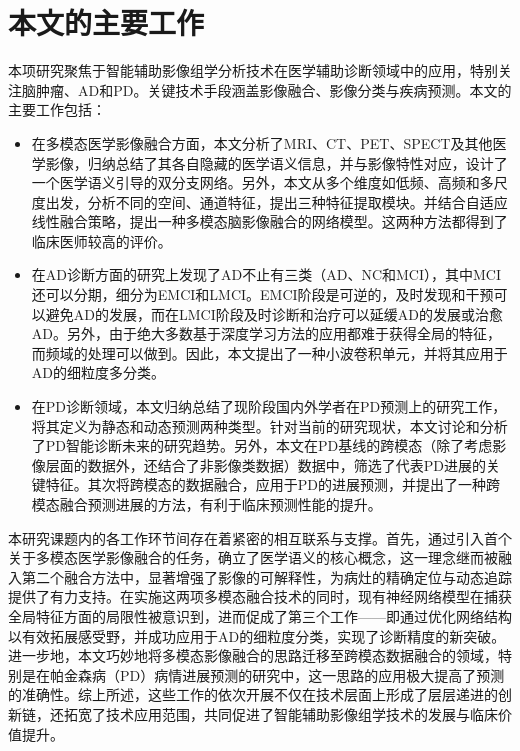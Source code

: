 \section{本文的主要工作}
本项研究聚焦于智能辅助影像组学分析技术在医学辅助诊断领域中的应用，特别关注脑肿瘤、AD和PD。关键技术手段涵盖影像融合、影像分类与疾病预测。本文的主要工作包括：
\begin{itemize}
    \item 在多模态医学影像融合方面，本文分析了MRI、CT、PET、SPECT及其他医学影像，归纳总结了其各自隐藏的医学语义信息，并与影像特性对应，设计了一个医学语义引导的双分支网络。另外，本文从多个维度如低频、高频和多尺度出发，分析不同的空间、通道特征，提出三种特征提取模块。并结合自适应线性融合策略，提出一种多模态脑影像融合的网络模型。这两种方法都得到了临床医师较高的评价。
    \item 在AD诊断方面的研究上发现了AD不止有三类（AD、NC和MCI），其中MCI还可以分期，细分为EMCI和LMCI。EMCI阶段是可逆的，及时发现和干预可以避免AD的发展，而在LMCI阶段及时诊断和治疗可以延缓AD的发展或治愈AD。另外，由于绝大多数基于深度学习方法的应用都难于获得全局的特征，而频域的处理可以做到。因此，本文提出了一种小波卷积单元，并将其应用于AD的细粒度多分类。
    \item 在PD诊断领域，本文归纳总结了现阶段国内外学者在PD预测上的研究工作，将其定义为静态和动态预测两种类型。针对当前的研究现状，本文讨论和分析了PD智能诊断未来的研究趋势。另外，本文在PD基线的跨模态（除了考虑影像层面的数据外，还结合了非影像类数据）数据中，筛选了代表PD进展的关键特征。其次将跨模态的数据融合，应用于PD的进展预测，并提出了一种跨模态融合预测进展的方法，有利于临床预测性能的提升。
\end{itemize}


本研究课题内的各工作环节间存在着紧密的相互联系与支撑。首先，通过引入首个关于多模态医学影像融合的任务，确立了医学语义的核心概念，这一理念继而被融入第二个融合方法中，显著增强了影像的可解释性，为病灶的精确定位与动态追踪提供了有力支持。在实施这两项多模态融合技术的同时，现有神经网络模型在捕获全局特征方面的局限性被意识到，进而促成了第三个工作——即通过优化网络结构以有效拓展感受野，并成功应用于AD的细粒度分类，实现了诊断精度的新突破。
进一步地，本文巧妙地将多模态影像融合的思路迁移至跨模态数据融合的领域，特别是在帕金森病（PD）病情进展预测的研究中，这一思路的应用极大提高了预测的准确性。综上所述，这些工作的依次开展不仅在技术层面上形成了层层递进的创新链，还拓宽了技术应用范围，共同促进了智能辅助影像组学技术的发展与临床价值提升。


